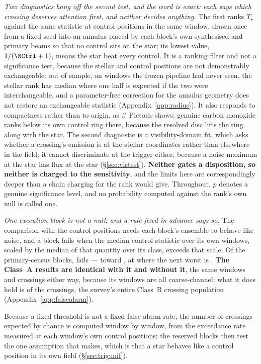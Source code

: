 \emph{Two diagnostics hang off the second test, and the word is exact: each
says which crossing deserves attention first, and neither decides anything.}
The first ranks $T_\star$ against the same statistic at \NCtrl{} control
positions in the same window, drawn once from a fixed seed into an annulus
placed by each block's own synthesised and primary beams so that no control
sits on the star; its lowest value, $1/(\NCtrl+1)$, means the star beat every
control. It is a ranking filter and not a significance test, because the
stellar and control positions are not demonstrably exchangeable: out of
sample, on \HoWin{} windows the frozen pipeline had never seen, the stellar
rank has median \HoRankMed{} where one half is expected if the two were
interchangeable, and a parameter-free correction for the annulus geometry
does not restore an exchangeable statistic (Appendix~\ref{app:radius}). It
also responds to compactness rather than to origin, as $\beta$~Pictoris
shows: genuine carbon monoxide ranks below its own control ring there,
because the resolved disc lifts the ring along with the star. The second
diagnostic is a visibility-domain fit, which asks whether a crossing's
emission is at the stellar coordinates rather than elsewhere in the field; it
cannot discriminate at the trigger either, because a noise maximum at the
star has flux at the star (\S\ref{sec:vistest}). \textbf{Neither gates a
disposition, so neither is charged to the sensitivity}, and the limits here
are correspondingly deeper than a chain charging for the rank would give.
Throughout, $p$ denotes a genuine significance level, and no probability
computed against the rank's own null is called one.

\emph{One execution block is not a null, and a rule fixed in advance says so.}
The comparison with the control positions needs each block's ensemble to behave
like noise, and a block fails when the median control statistic over its own
windows, scaled by the median of that quantity over its class, exceeds
\BqFactor{} that scale. Of the \BqNBlocks{} primary-census blocks, \BqNFail{}
fails --- \BqFailBlock{} toward \BqFailStar, at \BqFailQ{} where the next worst
is \BqNextQ. \textbf{The Class~A results are identical with it and without it},
the same \BqWinACut{} windows and \BqXrossACut{} crossings either way, because
its \BqFailNWin{} windows are all coarse-channel; what it does hold is
\BqFailNCross{} of the \NCross{} crossings, the survey's entire Class~B
crossing population (Appendix~\ref{app:falsealarm}).

Because a fixed threshold is not a fixed false-alarm rate, the number of
crossings expected by chance is computed window by window, from the
exceedance rate measured at each window's own control positions; the reserved
blocks then test the one assumption that makes, which is that a star behaves
like a control position in its own field (\S\ref{sec:trigunif}).

